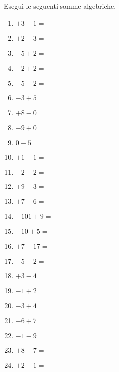 \begin{esercizio}
Esegui le seguenti somme algebriche.
 \label{ese:2.14}
 \begin{multicols}{4}
 \begin{enumerate}[noitemsep, label=(\alph*)]
 \item \(+3 -1 =\)
 \item \(+2 -3 =\)
 \item \(-5 +2 =\)
 \item \(-2 +2 =\)
 \item \(-5 -2 =\)
 \item \(-3 +5 =\)
 \item \(+8 -0 =\)
 \item \(-9 +0 =\)
 \item \(0 -5 =\)
 \item \(+1 -1 =\)
 \item \(-2 -2 =\)
 \item \(+9 -3 =\)
 \item \(+7 -6 =\)
 \item \(-101 +9 =\)
 \item \(-10 +5 =\)
 \item \(+7 -17 =\)
 \item \(-5 -2 =\)
 \item \(+3 -4 =\)
 \item \(-1 +2 =\)
 \item \(-3 +4 =\)
 \item \(-6 +7 =\)
 \item \(-1 -9 =\)
 \item \(+8 -7 =\)
 \item \(+2 -1 =\)
 \end{enumerate}

\end{multicols}

\end{esercizio}


